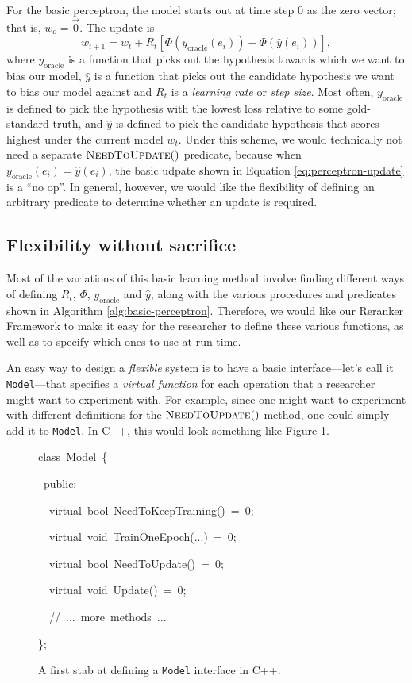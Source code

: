 \documentclass[a4paper]{article}
\newenvironment{lyxcode}
{\par\begin{list}{}{
\scriptsize
\setlength{\leftmargin}{0.1in}
\setlength{\rightmargin}{\leftmargin}
\setlength{\listparindent}{0pt}%
\raggedright
\setlength{\itemsep}{0pt}
\setlength{\parsep}{0pt}
\normalfont\ttfamily}%
 \item[]}
{\end{list}}
\begin{document}
For the basic perceptron, the model starts out at time step 0 as the
zero vector; that is, $w_{o}=\vec{0}.$ The update is 
\begin{equation}
w_{t+1}=w_{t}+R_{t}\left[\Phi\left(y_{\mathrm{oracle}}\left(e_{i}\right)\right)-\Phi\left(\hat{y}\left(e_{i}\right)\right)\right],\label{eq:perceptron-update}
\end{equation}
 where $y_{\mathrm{oracle}}$ is a function that picks out the hypothesis
towards which we want to bias our model, $\hat{y}$ is a function
that picks out the candidate hypothesis we want to bias our model
against and $R_{t}$ is a \emph{learning rate} or \emph{step size}.
Most often, $y_{\mathrm{oracle}}$ is defined to pick the hypothesis
with the lowest loss relative to some gold-standard truth, and $\hat{y}$
is defined to pick the candidate hypothesis that scores highest under
the current model $w_{t}$. Under this scheme, we would technically
not need a separate $ $$\Call{NeedToUpdate}{}()$ predicate, because
when $y_{\mathrm{oracle}}\left(e_{i}\right)=\hat{y}\left(e_{i}\right)$,
the basic udpate shown in Equation \ref{eq:perceptron-update} is
a ``no op''. In general, however, we would like the flexibility
of defining an arbitrary predicate to determine whether an update
is required.


\subsection{Flexibility without sacrifice}

Most of the variations of this basic learning method involve finding
different ways of defining $R_{t}$, $\Phi$, $y_{\mathrm{oracle}}$
and $\hat{y}$, along with the various procedures and predicates shown
in Algorithm \ref{alg:basic-perceptron}. Therefore, we would like
our Reranker Framework to make it easy for the researcher to define
these various functions, as well as to specify which ones to use at
run-time.

An easy way to design a \emph{flexible} system is to have a basic
interface---let's call it \texttt{Model}---that specifies a \emph{virtual
function} for each operation that a researcher might want to experiment
with. For example, since one might want to experiment with different
definitions for the $\Call{NeedToUpdate}{}()$ method, one could simply
add it to \texttt{Model}. In C++, this would look something like Figure
\ref{fig:model-interface}.

\begin{figure}
\begin{lyxcode}
class~Model~\{

~public:

~~virtual~bool~NeedToKeepTraining()~=~0;

~~virtual~void~TrainOneEpoch(...)~=~0;

~~virtual~bool~NeedToUpdate()~=~0;

~~virtual~void~Update()~=~0;

~~//~...~more~methods~...

\};
\end{lyxcode}
\caption{\label{fig:model-interface}A first stab at defining a \texttt{Model}
interface in C++.}
\end{figure}
\end{document}
